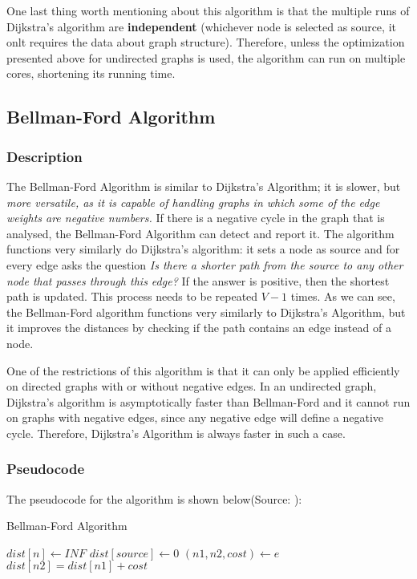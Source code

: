 \documentclass[runningheads]{llncs}
\begin{document}
One last thing worth mentioning about this algorithm is that the multiple runs of Dijkstra's algorithm are \textbf{independent} (whichever node is selected as source, it onlt requires the data about graph structure). Therefore, unless the optimization presented above for undirected graphs is used, the algorithm can run on multiple cores, shortening its running time.

\subsection{Bellman-Ford Algorithm}
\subsubsection{Description}
The Bellman-Ford Algorithm is similar to Dijkstra's Algorithm; it is slower, but \textit{more versatile, as it is capable of handling graphs in which some of the edge weights are negative numbers.}\cite{ref_url_BF} If there is a negative cycle in the graph that is analysed, the Bellman-Ford Algorithm can detect and report it. The algorithm functions very similarly do Dijkstra's algorithm: it sets a node as source and for every edge asks the question \textit{Is there a shorter path from the source to any other node that passes through this edge?} If the answer is positive, then the shortest path is updated. This process needs to be repeated $V-1$ times. As we can see, the Bellman-Ford algorithm functions very similarly to Dijkstra's Algorithm, but it improves the distances by checking if the path contains an edge instead of a node.

One of the restrictions of this algorithm is that it can only be applied efficiently on directed graphs with or without negative edges. In an undirected graph, Dijkstra's algorithm is asymptotically faster than Bellman-Ford and it cannot run on graphs with negative edges, since any negative edge will define a negative cycle. Therefore, Dijkstra's Algorithm is always faster in such a case.

\subsubsection{Pseudocode}
The pseudocode for the algorithm is shown below(Source: \cite{ref_url_BF}):
\begin{algorithm}
\caption{Bellman-Ford Algorithm}\label{algBF:cap}
\begin{algorithmic}[1]
	\State $dist[n] \gets INF$
\EndFor
\State $dist[source] \gets 0$
		\State $(n1, n2, cost) \gets e$
			\State $dist[n2] = dist[n1] + cost$
		\EndIf
	\EndFor
\EndFor
\end{algorithmic}
\end{algorithm}
\end{document}
